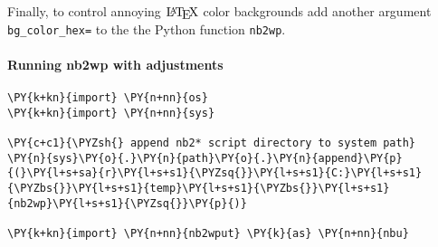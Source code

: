 \begin{Shaded}
\begin{Highlighting}[]
\InformationTok{:}\InformationTok{:}\InformationTok{:} \NormalTok{;}
\InformationTok{:}\InformationTok{:}\InformationTok{:} \NormalTok{;}
\InformationTok{:}\InformationTok{:}\InformationTok{:} \NormalTok{;}
\end{Highlighting}
\end{Shaded}

Finally, to control annoying \(\LaTeX\) color backgrounds add another
argument \texttt{bg\_color\_hex=\textquotesingle{}\textquotesingle{}} to
the the Python function \texttt{nb2wp}.

    \hypertarget{running-nb2wp-with-adjustments}{%
\paragraph{Running nb2wp with
adjustments}\label{running-nb2wp-with-adjustments}}

    \begin{tcolorbox}[breakable, size=fbox, boxrule=1pt, pad at break*=1mm,colback=cellbackground, colframe=cellborder]
\begin{Verbatim}[commandchars=\\\{\}]
\PY{k+kn}{import} \PY{n+nn}{os}
\PY{k+kn}{import} \PY{n+nn}{sys}

\PY{c+c1}{\PYZsh{} append nb2* script directory to system path}
\PY{n}{sys}\PY{o}{.}\PY{n}{path}\PY{o}{.}\PY{n}{append}\PY{p}{(}\PY{l+s+sa}{r}\PY{l+s+s1}{\PYZsq{}}\PY{l+s+s1}{C:}\PY{l+s+s1}{\PYZbs{}}\PY{l+s+s1}{temp}\PY{l+s+s1}{\PYZbs{}}\PY{l+s+s1}{nb2wp}\PY{l+s+s1}{\PYZsq{}}\PY{p}{)}

\PY{k+kn}{import} \PY{n+nn}{nb2wput} \PY{k}{as} \PY{n+nn}{nbu}
\end{Verbatim}
\end{tcolorbox}

